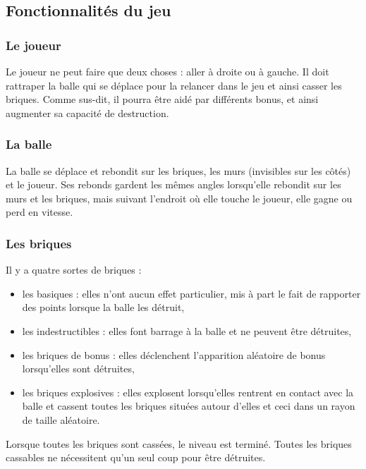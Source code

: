 \documentclass[a4paper,10pt]{article}
\begin{document}
\subsection{Fonctionnalités du jeu}
    \subsubsection{Le joueur}
        Le joueur ne peut faire que deux choses : aller à droite ou à gauche. Il doit rattraper la balle
        qui se déplace pour la relancer dans le jeu et ainsi casser les briques. Comme sus-dit, il pourra
        être aidé par différents bonus, et ainsi augmenter sa capacité de destruction.
	
	\newpage
    \subsubsection{La balle}
        La balle se déplace et rebondit sur les briques, les murs (invisibles sur les côtés) et le joueur.
        Ses rebonds gardent les mêmes angles lorsqu'elle rebondit sur les murs et les briques, mais suivant
        l'endroit où elle touche le joueur, elle gagne ou perd en vitesse.

    \subsubsection{Les briques}
        Il y a quatre sortes de briques :
        \begin{itemize}
            \item les basiques : elles n'ont aucun effet particulier, mis à part le fait de rapporter des points lorsque la balle les détruit,
            \item les indestructibles : elles font barrage à la balle et ne peuvent être détruites,
            \item les briques de bonus : elles déclenchent l'apparition aléatoire de bonus lorsqu'elles sont détruites,
            \item les briques explosives : elles explosent lorsqu'elles rentrent en contact avec la balle et cassent toutes les briques situées autour d'elles 
                    et ceci dans un rayon de taille aléatoire.
        \end{itemize}

        Lorsque toutes les briques sont cassées, le niveau est terminé. Toutes les briques cassables
        ne nécessitent qu'un seul coup pour être détruites.
\end{document}
